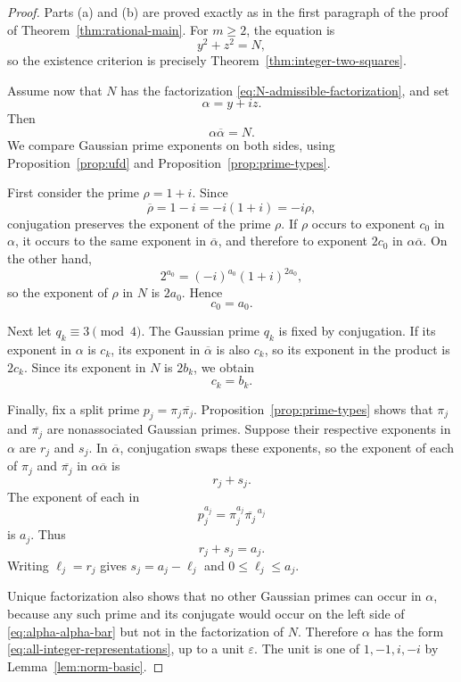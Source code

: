 \documentclass[11pt,a4paper]{article}
\numberwithin{equation}{section}
\theoremstyle{definition}
\theoremstyle{remark}
\begin{document}
\begin{proof}
Parts (a) and (b) are proved exactly as in the first paragraph of the proof of Theorem~\ref{thm:rational-main}. For $m\geq2$, the equation is
\[
 y^2+z^2=N,
\]
so the existence criterion is precisely Theorem~\ref{thm:integer-two-squares}.

Assume now that $N$ has the factorization \eqref{eq:N-admissible-factorization}, and set
\[
 \alpha=y+iz.
\]
Then
\begin{equation}
 \alpha\overline\alpha=N.
 \label{eq:alpha-alpha-bar}
\end{equation}
We compare Gaussian prime exponents on both sides, using Proposition~\ref{prop:ufd} and Proposition~\ref{prop:prime-types}.

First consider the prime $\rho=1+i$. Since
\[
 \overline\rho=1-i=-i(1+i)=-i\rho,
\]
conjugation preserves the exponent of the prime $\rho$. If $\rho$ occurs to exponent $c_0$ in $\alpha$, it occurs to the same exponent in $\overline\alpha$, and therefore to exponent $2c_0$ in $\alpha\overline\alpha$. On the other hand,
\[
 2^{a_0}=(-i)^{a_0}(1+i)^{2a_0},
\]
so the exponent of $\rho$ in $N$ is $2a_0$. Hence
\[
 c_0=a_0.
\]

Next let $q_k\equiv3\pmod4$. The Gaussian prime $q_k$ is fixed by conjugation. If its exponent in $\alpha$ is $c_k$, its exponent in $\overline\alpha$ is also $c_k$, so its exponent in the product is $2c_k$. Since its exponent in $N$ is $2b_k$, we obtain
\[
 c_k=b_k.
\]

Finally, fix a split prime $p_j=\pi_j\overline{\pi_j}$. Proposition~\ref{prop:prime-types} shows that $\pi_j$ and $\overline{\pi_j}$ are nonassociated Gaussian primes. Suppose their respective exponents in $\alpha$ are $r_j$ and $s_j$. In $\overline\alpha$, conjugation swaps these exponents, so the exponent of each of $\pi_j$ and $\overline{\pi_j}$ in $\alpha\overline\alpha$ is
\[
 r_j+s_j.
\]
The exponent of each in
\[
 p_j^{a_j}=\pi_j^{a_j}\overline{\pi_j}^{\,a_j}
\]
is $a_j$. Thus
\[
 r_j+s_j=a_j.
\]
Writing $\ell_j=r_j$ gives $s_j=a_j-\ell_j$ and $0\leq\ell_j\leq a_j$.

Unique factorization also shows that no other Gaussian primes can occur in $\alpha$, because any such prime and its conjugate would occur on the left side of \eqref{eq:alpha-alpha-bar} but not in the factorization of $N$. Therefore $\alpha$ has the form \eqref{eq:all-integer-representations}, up to a unit $\varepsilon$. The unit is one of $1,-1,i,-i$ by Lemma~\ref{lem:norm-basic}.


\end{proof}
\end{document}
